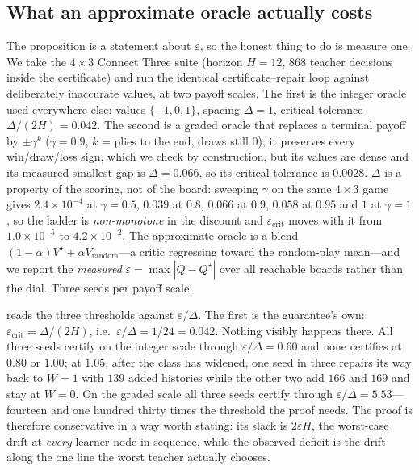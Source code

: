 \documentclass[conference]{IEEEtran}
\begin{document}
\subsection{What an approximate oracle actually costs}
\label{sec:eps}
The proposition is a statement about $\varepsilon$, so the honest thing to do is measure one. We take the $4\times3$ Connect Three suite (horizon $H=12$, 868 teacher decisions inside the certificate) and run the identical certificate--repair loop against deliberately inaccurate values, at two payoff scales. The first is the integer oracle used everywhere else: values $\{-1,0,1\}$, spacing $\Delta=1$, critical tolerance $\Delta/(2H)=0.042$. The second is a graded oracle that replaces a terminal payoff by $\pm\gamma^{k}$ ($\gamma=0.9$, $k$ = plies to the end, draws still $0$); it preserves every win/draw/loss sign, which we check by construction, but its values are dense and its measured smallest gap is $\Delta=0.066$, so its critical tolerance is $0.0028$. $\Delta$ is a property of the scoring, not of the board: sweeping $\gamma$ on the same $4\times3$ game gives $2.4\times10^{-4}$ at $\gamma=0.5$, $0.039$ at $0.8$, $0.066$ at $0.9$, $0.058$ at $0.95$ and $1$ at $\gamma=1$, so the ladder is \emph{non-monotone} in the discount and $\varepsilon_{\mathrm{crit}}$ moves with it from $1.0\times10^{-5}$ to $4.2\times10^{-2}$. The approximate oracle is a blend $(1-\alpha)V^{\star}+\alpha V_{\text{random}}$---a critic regressing toward the random-play mean---and we report the \emph{measured} $\varepsilon=\max|\tilde Q-Q^{\star}|$ over all reachable boards rather than the dial. Three seeds per payoff scale.

 reads the three thresholds against $\varepsilon/\Delta$. The first is the guarantee's own: $\varepsilon_{\mathrm{crit}}=\Delta/(2H)$, i.e.\ $\varepsilon/\Delta=1/24=0.042$. Nothing visibly happens there. All three seeds certify on the integer scale through $\varepsilon/\Delta=0.60$ and none certifies at $0.80$ or $1.00$; at $1.05$, after the class has widened, one seed in three repairs its way back to $W=1$ with $139$ added histories while the other two add $166$ and $169$ and stay at $W=0$. On the graded scale all three seeds certify through $\varepsilon/\Delta=5.53$---fourteen and one hundred thirty times the threshold the proof needs. The proof is therefore conservative in a way worth stating: its slack is $2\varepsilon H$, the worst-case drift at \emph{every} learner node in sequence, while the observed deficit is the drift along the one line the worst teacher actually chooses.
\end{document}
